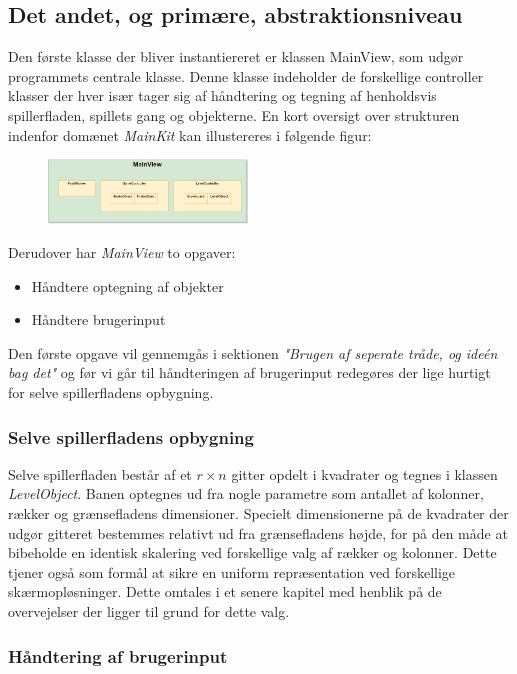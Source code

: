 \documentclass[]{article}
\begin{document}
\subsection{Det andet, og primære, abstraktionsniveau}
Den første klasse der bliver instantiereret er klassen MainView, som udgør programmets centrale klasse. Denne klasse indeholder de forskellige controller klasser der hver især tager sig af håndtering og tegning af henholdsvis spillerfladen, spillets gang og objekterne. En kort oversigt over strukturen indenfor domænet \textit{MainKit} kan illustereres i følgende figur:

\begin{figure}[h!]
	\centering
	\includegraphics[width=200px]{Domain_diagram.jpg}
	\label{fig:diagram2}
\end{figure}

Derudover har \textit{MainView} to opgaver:
\begin{itemize}
	\item Håndtere optegning af objekter
	\item Håndtere brugerinput
\end{itemize}

Den første opgave vil gennemgås i sektionen \textit{"Brugen af seperate tråde, og ideén bag det"} og før vi går til håndteringen af brugerinput redegøres der lige hurtigt for selve spillerfladens opbygning.

\subsubsection{Selve spillerfladens opbygning}

Selve spillerfladen består af et $r \times n$ gitter opdelt i kvadrater og tegnes i klassen \textit{LevelObject}. Banen optegnes ud fra nogle parametre som antallet af kolonner, rækker og grænsefladens dimensioner. Specielt dimensionerne på de kvadrater der udgør gitteret bestemmes relativt ud fra grænsefladens højde, for på den måde at bibeholde en identisk skalering ved forskellige valg af rækker og kolonner. Dette tjener også som formål at sikre en uniform repræsentation ved forskellige skærmopløsninger. Dette omtales i et senere kapitel med henblik på de overvejelser der ligger til grund for dette valg.

\subsubsection{Håndtering af brugerinput}
\end{document}
